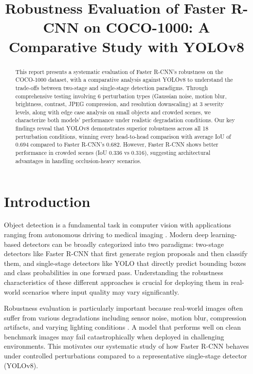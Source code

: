 \documentclass[conference]{IEEEtran}
\begin{document}
\title{Robustness Evaluation of Faster R-CNN on COCO-1000: A Comparative Study with YOLOv8}
\author{
}
\maketitle

\begin{abstract}
This report presents a systematic evaluation of Faster R-CNN's robustness on the COCO-1000 dataset, with a comparative analysis against YOLOv8 to understand the trade-offs between two-stage and single-stage detection paradigms. Through comprehensive testing involving 6 perturbation types (Gaussian noise, motion blur, brightness, contrast, JPEG compression, and resolution downscaling) at 3 severity levels, along with edge case analysis on small objects and crowded scenes, we characterize both models' performance under realistic degradation conditions. Our key findings reveal that YOLOv8 demonstrates superior robustness across all 18 perturbation conditions, winning every head-to-head comparison with average IoU of 0.694 compared to Faster R-CNN's 0.682. However, Faster R-CNN shows better performance in crowded scenes (IoU 0.336 vs 0.316), suggesting architectural advantages in handling occlusion-heavy scenarios.
\end{abstract}

\section{Introduction}

Object detection is a fundamental task in computer vision with applications ranging from autonomous driving \cite{geiger2012kitti} to medical imaging \cite{litjens2017medical}. Modern deep learning-based detectors can be broadly categorized into two paradigms: two-stage detectors like Faster R-CNN \cite{ren2015faster} that first generate region proposals and then classify them, and single-stage detectors like YOLO \cite{redmon2016yolo} that directly predict bounding boxes and class probabilities in one forward pass. Understanding the robustness characteristics of these different approaches is crucial for deploying them in real-world scenarios where input quality may vary significantly.

Robustness evaluation is particularly important because real-world images often suffer from various degradations including sensor noise, motion blur, compression artifacts, and varying lighting conditions \cite{hendrycks2019benchmarking}. A model that performs well on clean benchmark images may fail catastrophically when deployed in challenging environments. This motivates our systematic study of how Faster R-CNN behaves under controlled perturbations compared to a representative single-stage detector (YOLOv8).
\end{document}
